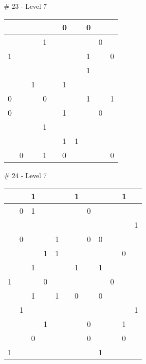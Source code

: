 \medskip

\# 23 - Level 7 \newline
\begin{tabular}{|m{\collen}|m{\collen}|m{\collen}|m{\collen}|m{\collen}|m{\collen}|m{\collen}|m{\collen}|m{\collen}|m{\collen}|}
\hline
    &   &   &   &   & 0 &   & 0 &   &   \\
\hline
    &   &   & 1 &   &   &   &   & 0 &   \\
\hline
  1 &   &   &   &   &   &   & 1 &   & 0 \\
\hline
    &   &   &   &   &   &   & 1 &   &   \\
\hline
    &   & 1 &   &   & 1 &   &   &   &   \\
\hline
  0 &   &   & 0 &   &   &   & 1 &   & 1 \\
\hline
  0 &   &   &   &   & 1 &   &   & 0 &   \\
\hline
    &   &   & 1 &   &   &   &   &   &   \\
\hline
    &   &   &   &   & 1 & 1 &   &   &   \\
\hline
    & 0 &   & 1 &   & 0 &   &   &   & 0 \\
\hline
\end{tabular}


\medskip

\# 24 - Level 7 \newline
\begin{tabular}{|m{\collen}|m{\collen}|m{\collen}|m{\collen}|m{\collen}|m{\collen}|m{\collen}|m{\collen}|m{\collen}|m{\collen}|m{\collen}|m{\collen}|}
\hline
    &   & 1 &   &   &   & 1 &   &   &   & 1 &   \\
\hline
    & 0 & 1 &   &   &   &   & 0 &   &   &   &   \\
\hline
    &   &   &   &   &   &   &   &   &   &   & 1 \\
\hline
    & 0 &   &   & 1 &   &   & 0 & 0 &   &   &   \\
\hline
    &   &   & 1 & 1 &   &   &   &   &   & 0 &   \\
\hline
    &   & 1 &   &   &   & 1 &   & 1 &   &   &   \\
\hline
  1 &   &   & 0 &   &   &   &   &   & 0 &   &   \\
\hline
    &   & 1 &   & 1 &   & 0 &   & 0 &   &   &   \\
\hline
    & 1 &   &   &   &   &   &   &   &   &   & 1 \\
\hline
    &   &   & 1 &   &   &   & 0 &   &   & 1 &   \\
\hline
    &   & 0 &   &   &   &   & 0 &   &   & 0 &   \\
\hline
  1 &   &   &   &   &   &   &   & 1 &   &   &   \\
\hline
\end{tabular}


